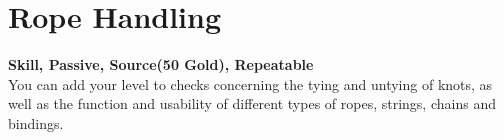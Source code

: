 \section{Rope Handling}\label{sec:ropeHandling}
\textbf{Skill, Passive, Source(50 Gold), Repeatable}\\
You can add your level to checks concerning the tying and untying of knots, as well as the function and usability of different types of ropes, strings, chains and bindings.